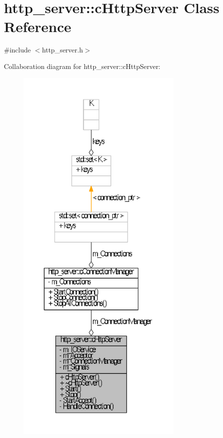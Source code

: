 \hypertarget{classhttp__server_1_1cHttpServer}{\section{http\-\_\-server\-:\-:c\-Http\-Server \-Class \-Reference}
\label{classhttp__server_1_1cHttpServer}
}


{\ttfamily \#include $<$http\-\_\-server.\-h$>$}



\-Collaboration diagram for http\-\_\-server\-:\-:c\-Http\-Server\-:\nopagebreak
\begin{figure}[H]
\begin{center}
\leavevmode
\includegraphics[height=550pt]{classhttp__server_1_1cHttpServer__coll__graph}
\end{center}
\end{figure}
